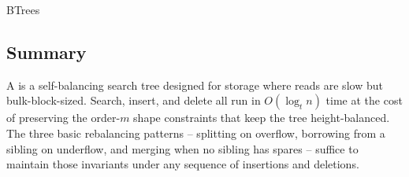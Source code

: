 \documentclass[hidelinks]{article}
\begin{document}
\begin{smodule}[title={B-Trees}]{BTrees}
\subsection{Summary}

A  is a self-balancing search tree designed for storage where reads are slow but bulk-block-sized. Search, insert, and delete all run in $O(\log_t n)$ time at the cost of preserving the order-$m$ shape constraints that keep the tree height-balanced. The three basic rebalancing patterns -- splitting on overflow, borrowing from a sibling on underflow, and merging when no sibling has spares -- suffice to maintain those invariants under any sequence of insertions and deletions.

\end{smodule}
\end{document}
